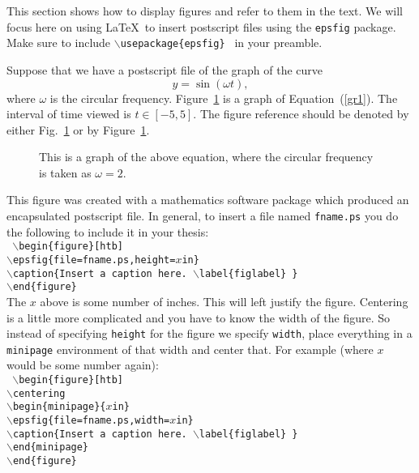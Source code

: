 This section shows how to display figures and refer to them in the text.
We will focus here on using \LaTeX\ to insert postscript files using the
{\tt epsfig} package.  Make sure to include
{\tt $\backslash$usepackage\{epsfig\} } in your preamble.

Suppose that we have a postscript file of the  graph of the curve
\begin{equation}
y=\sin(\omega t), \label{gr1}
\end{equation}
where $\omega$ is the circular frequency.
Figure~\ref{fig1} is a graph of Equation~(\ref{gr1}). The interval
of time viewed is $t \in [-5,5]$. The figure reference should be denoted
by either Fig.~\ref{fig1} or by Figure~\ref{fig1}.
\begin{figure}[htb]
\centering
\begin{minipage}{4.5in}
\caption{This is a graph of the above equation, where the
circular frequency is taken as $\omega = 2$.\label{fig1}}
\end{minipage}
\end{figure}

This figure was created with a mathematics software package which
produced an encapsulated postscript file.  
In general, to insert  a file named {\tt fname.ps} you
do the following to include it in your thesis:
\\
{ \tt
\hspace*{0.5in} $\backslash$begin\{figure\}[htb]
\\
\hspace*{0.5in} $\backslash$epsfig\{file=fname.ps,height=$x$in\}
\\
\hspace*{0.5in} $\backslash$caption\{Insert a caption here. $\backslash$label\{figlabel\} \}
\\ 
\hspace*{0.5in} $\backslash$end\{figure\}
}
\\
The $x$ above is some number of inches.
This will left justify the figure.  Centering is
a little more complicated and you have to know the width of the figure.
So instead of specifying {\tt height} for the figure we specify
{\tt width}, place everything in a {\tt minipage} environment of that width
and center that.  For example (where $x$ would be some number again):
\\
{ \tt
\hspace*{0.5in} $\backslash$begin\{figure\}[htb]
\\
\hspace*{0.5in} $\backslash$centering
\\
\hspace*{0.5in} $\backslash$begin\{minipage\}\{$x$in\}
\\
\hspace*{0.5in} $\backslash$epsfig\{file=fname.ps,width=$x$in\}
\\
\hspace*{0.5in} $\backslash$caption\{Insert a caption here. $\backslash$label\{figlabel\} \}
\\
\hspace*{0.5in} $\backslash$end\{minipage\}
\\
\hspace*{0.5in} $\backslash$end\{figure\}
}

